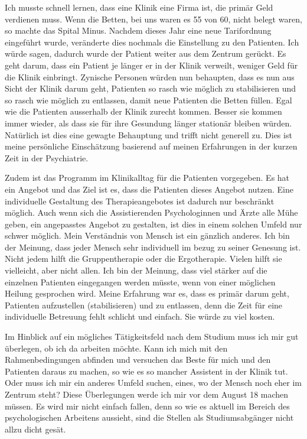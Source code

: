 \documentclass[jou,apacite]{apa6}
\begin{document}
Ich musste schnell lernen, dass eine Klinik eine Firma ist, die primär Geld verdienen muss. Wenn die Betten, bei uns waren es 55 von 60, nicht belegt waren, so machte das Spital Minus. Nachdem dieses Jahr eine neue Tarifordnung eingeführt wurde, veränderte dies nochmals die Einstellung zu den Patienten. Ich würde sagen, dadurch wurde der Patient weiter aus dem Zentrum gerückt. Es geht darum, dass ein Patient je länger er in der Klinik verweilt, weniger Geld für die Klinik einbringt. Zynische Personen würden nun behaupten, dass es nun aus Sicht der Klinik darum geht, Patienten so rasch wie möglich zu stabilisieren und so rasch wie möglich zu entlassen, damit neue Patienten die Betten füllen. Egal wie die Patienten ausserhalb der Klinik zurecht kommen. Besser sie kommen immer wieder, als dass sie für ihre Gesundung länger stationär bleiben würden. Natürlich ist dies eine gewagte Behauptung und trifft nicht generell zu. Dies ist meine persönliche Einschätzung basierend auf meinen Erfahrungen in der kurzen Zeit in der Psychiatrie. 

Zudem ist das Programm im Klinikalltag für die Patienten vorgegeben. Es hat ein Angebot und das Ziel ist es, dass die Patienten dieses Angebot nutzen. Eine individuelle Gestaltung des Therapieangebotes ist dadurch nur beschränkt möglich. Auch wenn sich die Assistierenden Psychologinnen und Ärzte alle Mühe geben, ein angepasstes Angebot zu gestalten, ist dies in einem solchen Umfeld nur schwer möglich. Mein Verständnis von Mensch ist ein gänzlich anderes. Ich bin der Meinung, dass jeder Mensch sehr individuell im bezug zu seiner Genesung ist. Nicht jedem hilft die Gruppentherapie oder die Ergotherapie. Vielen hilft sie vielleicht, aber nicht allen. Ich bin der Meinung, dass viel stärker auf die einzelnen Patienten eingegangen werden müsste, wenn von einer möglichen Heilung gesprochen wird. Meine Erfahrung war es, dass es primär darum geht, Patienten aufzustellen (stabilisieren) und zu entlassen, denn die Zeit für eine individuelle Betreuung fehlt schlicht und einfach. Sie würde zu viel kosten. 

Im Hinblick auf ein mögliches Tätigkeitsfeld nach dem Studium muss ich mir gut überlegen, ob ich da arbeiten möchte. Kann ich mich mit den Rahmenbedingungen abfinden und versuchen das Beste für mich und den Patienten daraus zu machen, so wie es so mancher Assistent in der Klinik tut. Oder muss ich mir ein anderes Umfeld suchen, eines, wo der Mensch noch eher im Zentrum steht? Diese Überlegungen werde ich mir vor dem August 18 machen müssen. Es wird mir nicht einfach fallen, denn so wie es aktuell im Bereich des psychologischen Arbeitens aussieht, sind die Stellen als Studiumsabgänger nicht allzu dicht gesät.
    
\end{document}
